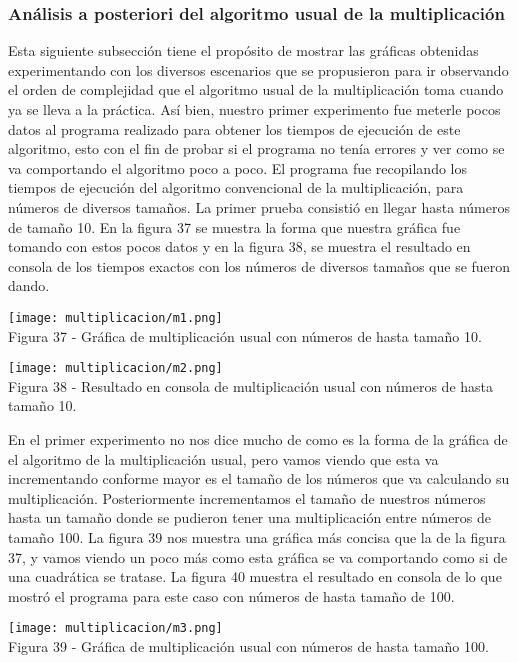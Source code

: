 \documentclass[12pt,twoside]{article}
\begin{document}
\subsubsection{Análisis a posteriori del algoritmo usual de la multiplicación}
Esta siguiente subsección tiene el propósito de mostrar las gráficas obtenidas experimentando con los diversos escenarios que se propusieron para ir observando el orden de complejidad que el algoritmo usual de la multiplicación toma cuando ya se lleva a la práctica.\newline\newline
Así bien, nuestro primer experimento fue meterle pocos datos al programa realizado para obtener los tiempos de ejecución de este algoritmo, esto con el fin de probar si el programa no tenía errores y ver como se va comportando el algoritmo poco a poco. El programa fue recopilando los tiempos de ejecución del algoritmo convencional de la multiplicación, para números de diversos tamaños. La primer prueba consistió en llegar hasta números de tamaño 10. En la figura 37 se muestra la forma que nuestra gráfica fue tomando con estos pocos datos y en la figura 38, se muestra el resultado en consola de los tiempos exactos con los números de diversos tamaños que se fueron dando.
\begin{center}
    \texttt{[image: multiplicacion/m1.png]}\\
    Figura 37 - Gráfica de multiplicación usual con números de hasta tamaño 10.
\end{center}
\begin{center}
    \texttt{[image: multiplicacion/m2.png]}\\
    Figura 38 - Resultado en consola de multiplicación usual con números de hasta tamaño 10.
\end{center}
En el primer experimento no nos dice mucho de como es la forma de la gráfica de el algoritmo de la multiplicación usual, pero vamos viendo que esta va incrementando conforme mayor es el tamaño de los números que va calculando su multiplicación. Posteriormente incrementamos el tamaño de nuestros números hasta un tamaño donde se pudieron tener una multiplicación entre números de tamaño 100. La figura 39 nos muestra una gráfica más concisa que la de la figura 37, y vamos viendo un poco más como esta gráfica se va comportando como si de una cuadrática se tratase. La figura 40 muestra el resultado en consola de lo que mostró el programa para este caso con números de hasta tamaño de 100.
\begin{center}
    \texttt{[image: multiplicacion/m3.png]}\\
    Figura 39 - Gráfica de multiplicación usual con números de hasta tamaño 100.
\end{center}
\end{document}
